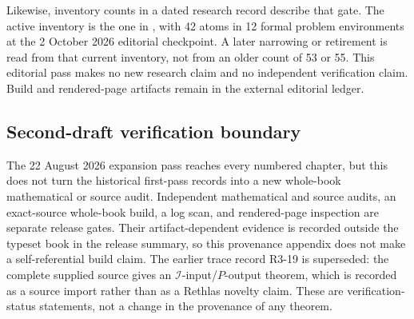 Likewise, inventory counts in a dated research record describe that gate.
The active inventory is the one in , with 42 atoms in
12 formal problem environments at the 2 October 2026 editorial checkpoint.
A later narrowing or retirement is read from that current inventory, not
from an older count of 53 or 55. This editorial pass makes no new research
claim and no independent verification claim. Build and rendered-page
artifacts remain in the external editorial ledger.

\subsection{Second-draft verification boundary}
\label{sec:appL-second-draft-boundary}

The 22 August 2026 expansion pass reaches every numbered chapter, but this
does not turn the historical first-pass records into a new whole-book
mathematical or source audit.  Independent mathematical and source audits,
an exact-source whole-book build, a log scan, and rendered-page inspection
are separate release gates.  Their artifact-dependent evidence is recorded
outside the typeset book in the release summary, so this provenance appendix
does not make a self-referential build claim.  The earlier trace record R3-19
is superseded: the complete supplied
source gives an
\(\mathcal I\)-input/\(P\)-output theorem, which is recorded as a source
import rather than as a Rethlas novelty claim.  These are
verification-status statements, not a change in the provenance of any
theorem.


